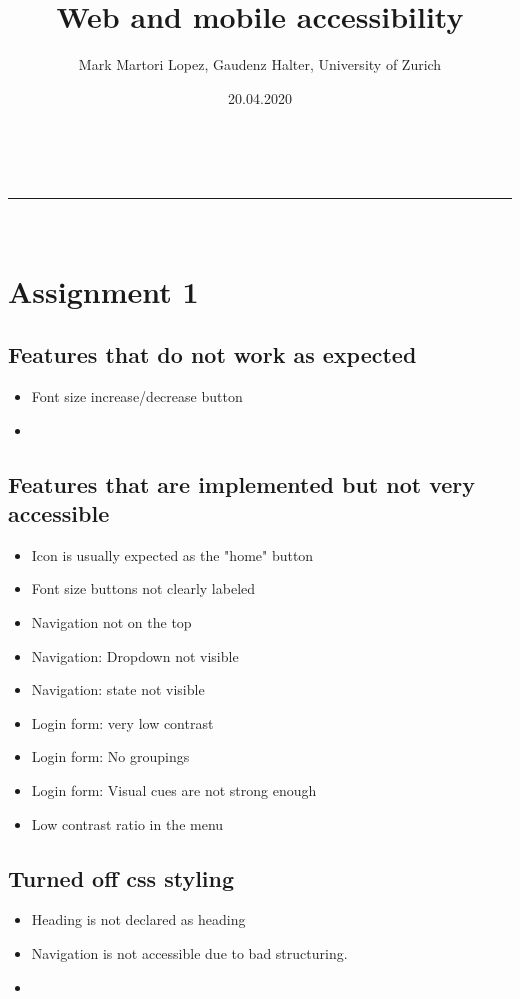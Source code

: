 \documentclass[a4paper,11pt]{article}
\makeatletter
\newcommand{\linia}{\rule{\linewidth}{0.5pt}}
\theoremstyle{mytheor}
\renewcommand{\maketitle}{
\begin{center}
\vspace{2ex}
{\huge \textsc{\@title}}
\vspace{1ex}
\\
\linia\\
\@author \hfill \@date
\vspace{4ex}
\end{center}
}
\makeatother
\begin{document}
\title{Web and mobile accessibility}

\author{Mark Martori Lopez, Gaudenz Halter, University of Zurich}

\date{20.04.2020}

\maketitle

\section{Assignment 1}
\subsection{Features that do not work as expected}
\begin{itemize}
    \item Font size increase/decrease button
    \item 
\end{itemize}

\subsection{Features that are implemented but not very accessible}
\begin{itemize}
    \item Icon is usually expected as the "home" button
    \item Font size buttons not clearly labeled
    \item Navigation not on the top
    \item Navigation: Dropdown not visible
    \item Navigation: state not visible
    \item Login form: very low contrast
    \item Login form: No groupings
    \item Login form: Visual cues are not strong enough
    
    \item Low contrast ratio in the menu
\end{itemize}

\subsection{Turned off css styling}
\begin{itemize}
    \item Heading is not declared as heading
    \item Navigation is not accessible due to bad structuring. 
    \item 
\end{itemize}
\end{document}
